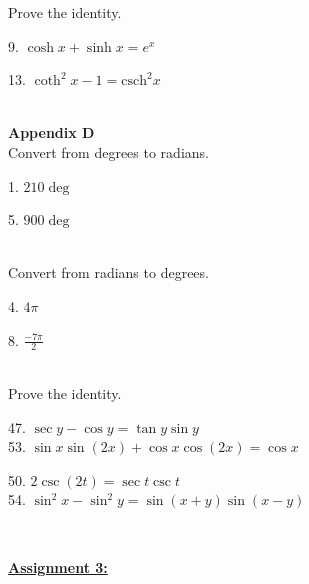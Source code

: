 \documentclass{letter}
\begin{document}
\begin{itemize}
		Prove the identity.\\
		\begin{minipage}[t]{0.5\textwidth}
			9. $\cosh x + \sinh x = e^x$
		\end{minipage}
		\begin{minipage}[t]{0.5\textwidth}
			13. $\coth^2 x - 1 = \text{csch}^2 x$\\
		\end{minipage}\\
		
		\textbf{Appendix D}\\
		
		Convert from degrees to radians.\\
		\begin{minipage}[t]{0.5\textwidth}
			1. $210\deg$
		\end{minipage}
		\begin{minipage}[t]{0.5\textwidth}
			5. $900\deg$\\
		\end{minipage}\\
		
		Convert from radians to degrees.\\
		\begin{minipage}[t]{0.5\textwidth}
			4. $4 \pi$
		\end{minipage}
		\begin{minipage}[t]{0.5\textwidth}
			8. $\frac{-7 \pi}{2}$\\
		\end{minipage}\\
		
		Prove the identity.\\
		\begin{minipage}[t]{0.5\textwidth}
			47. $\sec y - \cos y = \tan y \sin y$\\
			53. $\sin x \sin(2x) + \cos x \cos(2x) = \cos x$
		\end{minipage}
		\begin{minipage}[t]{0.5\textwidth}
			50. $2 \csc(2t) = \sec t \csc t$\\
			54. $\sin^2 x - \sin^2 y = \sin(x+y) \sin(x-y)$
		\end{minipage}\\
	\end{itemize}
	\clearpage
	\large\underline{\textbf{Assignment 3:}}
\end{document}
